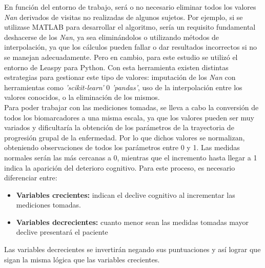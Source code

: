 En función del entorno de trabajo, será o no necesario eliminar todos los valores \textit{Nan} derivados de visitas no realizadas de algunos sujetos. Por ejemplo, si se utilizase MATLAB para desarrollar el algoritmo, sería un requisito fundamental deshacerse de los \textit{Nan}, ya sea eliminándolos o utilizando métodos de interpolación, ya que los cálculos pueden fallar o dar resultados incorrectos si no se manejan adecuadamente. Pero en cambio, para este estudio se utilizó el entorno de Leaspy para Python. Con esta herramienta existen distintas estrategias para gestionar este tipo de valores: imputación de los \textit{Nan} con herramientas como \textit{'scikit-learn'} 0 \textit{'pandas'}, uso de la interpolación entre los valores conocidos, o la eliminación de los mismos.\\

Para poder trabajar con las mediciones tomadas, se lleva a cabo la conversión de todos los biomarcadores a una misma escala, ya que los valores pueden ser muy variados y dificultaría la obtención de los parámetros de la trayectoria de progresión grupal de la enfermedad. Por lo que dichos valores se normalizan, obteniendo observaciones de todos los parámetros entre 0 y 1. Las medidas normales serán las más cercanas a 0, mientras que el incremento hasta llegar a 1 indica la aparición del deterioro cognitivo. Para este proceso, es necesario diferenciar entre:
\begin{itemize}
	\item \textbf{Variables crecientes:} indican el declive cognitivo al incrementar las mediciones tomadas.
	\item \textbf{Variables decrecientes:} cuanto menor sean las medidas tomadas mayor declive presentará el paciente
\end{itemize}

Las variables decrecientes se invertirán negando sus puntuaciones y así lograr que sigan la misma lógica que las variables crecientes.\\

